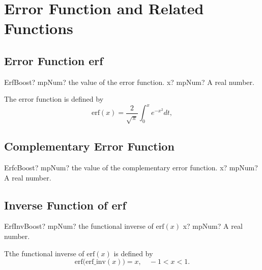 \section{Error Function and Related Functions}

\subsection{Error Function erf}
\label{Boost Error Function erf}

\begin{mpFunctionsExtract}
	\mpFunctionOne
	{ErfBoost? mpNum? the value of the error function.}
	{x? mpNum? A real number.}
\end{mpFunctionsExtract}


\vspace{0.3cm}
The error function is defined by
\begin{equation}
	\text{erf}(x) = \frac{2}{\sqrt{\pi}} \int_0^x e^{-x^2} dt,
\end{equation}



\subsection{Complementary Error Function}
\label{Boost Complementary Error Function}

\begin{mpFunctionsExtract}
	\mpFunctionOne
	{ErfcBoost? mpNum? the value of the complementary error function.}
	{x? mpNum? A real number.}
\end{mpFunctionsExtract}



\subsection{Inverse Function of erf}
\label{Boost Inverse Function of erf}

\begin{mpFunctionsExtract}
	\mpFunctionOne
	{ErfInvBoost? mpNum? the functional inverse of $\text{erf}(x)$}
	{x? mpNum? A real number.}
\end{mpFunctionsExtract}

\vspace{0.3cm}
Tthe functional inverse of $\text{erf}(x)$ is defined by
\begin{equation}
	\text{erf(erf\_inv}(x)) = x, \quad -1<x<1.
\end{equation}




